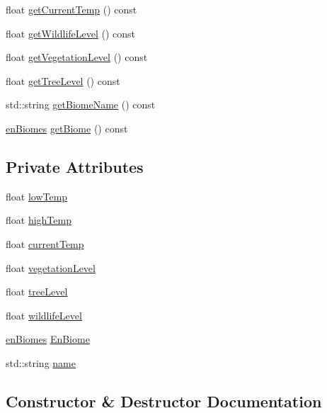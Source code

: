 \begin{DoxyCompactItemize}
\item 
float \mbox{\hyperlink{class_biome_a39f59fbedcc41210860860aa56fae295}{get\+Current\+Temp}} () const
\item 
float \mbox{\hyperlink{class_biome_a7041bd17e9ae2e15ab8a91b74fc4c83a}{get\+Wildlife\+Level}} () const
\item 
float \mbox{\hyperlink{class_biome_a3420593bad6a5c11dbbb7dc291409649}{get\+Vegetation\+Level}} () const
\item 
float \mbox{\hyperlink{class_biome_a45a00d5de84b75a3e4ef3dd00a08e71a}{get\+Tree\+Level}} () const
\item 
std\+::string \mbox{\hyperlink{class_biome_a5b7719cce19e74cfeb701e7fa4cdff4f}{get\+Biome\+Name}} () const
\item 
\mbox{\hyperlink{_enum_types_8hpp_a5c2255009cd01c90cf68245e6f453d1c}{en\+Biomes}} \mbox{\hyperlink{class_biome_a07d140ace0abea60f97735b509c41e66}{get\+Biome}} () const
\end{DoxyCompactItemize}
\subsection*{Private Attributes}
\begin{DoxyCompactItemize}
\item 
float \mbox{\hyperlink{class_biome_afe7165774528de18876c2df0b08faa9d}{low\+Temp}}
\item 
float \mbox{\hyperlink{class_biome_a389c810fbb09eea1fa5c4553ac976c77}{high\+Temp}}
\item 
float \mbox{\hyperlink{class_biome_a80ffc723aed56c5d9390a45e22a7742c}{current\+Temp}}
\item 
float \mbox{\hyperlink{class_biome_af2e689d891f991d1ec7abedb2d8cbfe6}{vegetation\+Level}}
\item 
float \mbox{\hyperlink{class_biome_aab11a193d913aeccf5a5d4d8af6ccd05}{tree\+Level}}
\item 
float \mbox{\hyperlink{class_biome_a4568b5f65ed8b774ef37d1126bb5ecd1}{wildlife\+Level}}
\item 
\mbox{\hyperlink{_enum_types_8hpp_a5c2255009cd01c90cf68245e6f453d1c}{en\+Biomes}} \mbox{\hyperlink{class_biome_a9171c1298078010a780475f5c0ab9d58}{En\+Biome}}
\item 
std\+::string \mbox{\hyperlink{class_biome_a45d0a14ac780f5a5a0215df8be24e8cf}{name}}
\end{DoxyCompactItemize}


\subsection{Constructor \& Destructor Documentation}
\mbox{\label{class_biome_aa340fc9737f1f60fe4aa99f5d4d5c726}} 
